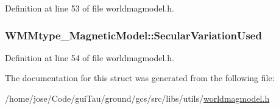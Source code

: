 Definition at line 53 of file worldmagmodel.\-h.

\hypertarget{struct_w_m_mtype___magnetic_model_aedce5f50c04bdcf6c244f5b1845ff6f4}{
\subsubsection[{Secular\-Variation\-Used}]{ W\-M\-Mtype\-\_\-\-Magnetic\-Model\-::\-Secular\-Variation\-Used}}\label{struct_w_m_mtype___magnetic_model_aedce5f50c04bdcf6c244f5b1845ff6f4}


Definition at line 54 of file worldmagmodel.\-h.



The documentation for this struct was generated from the following file\-:\begin{DoxyCompactItemize}
\item 
/home/jose/\-Code/gui\-Tau/ground/gcs/src/libs/utils/\hyperlink{worldmagmodel_8h}{worldmagmodel.\-h}\end{DoxyCompactItemize}
